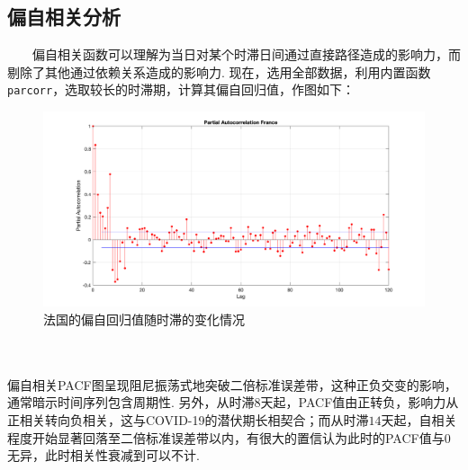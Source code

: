 \documentclass[a4paper, titlepage]{article}
\begin{document}
    \subsection{偏自相关分析}
    　　偏自相关函数可以理解为当日对某个时滞日间通过直接路径造成的影响力，而剔除了其他通过依赖关系造成的影响力. 现在，选用全部数据，利用内置函数\texttt{parcorr}，选取较长的时滞期，计算其偏自回归值，作图如下：\\
\begin{minipage}{\textwidth}
    \begin{figure}[H]
        \centering
        \includegraphics[width=\textwidth]{./images/France_PACF.png}
        \vspace{-3em}
        \caption{法国的偏自回归值随时滞的变化情况}
        \label{images:France_ACF}
    \end{figure}
\end{minipage}\\\quad\\
偏自相关PACF图呈现阻尼振荡式地突破二倍标准误差带，这种正负交变的影响，通常暗示时间序列包含周期性. 另外，从时滞$8$天起，PACF值由正转负，影响力从正相关转向负相关，这与COVID-19的潜伏期长相契合；而从时滞$14$天起，自相关程度开始显著回落至二倍标准误差带以内，有很大的置信认为此时的PACF值与$0$无异，此时相关性衰减到可以不计.
\end{document}
